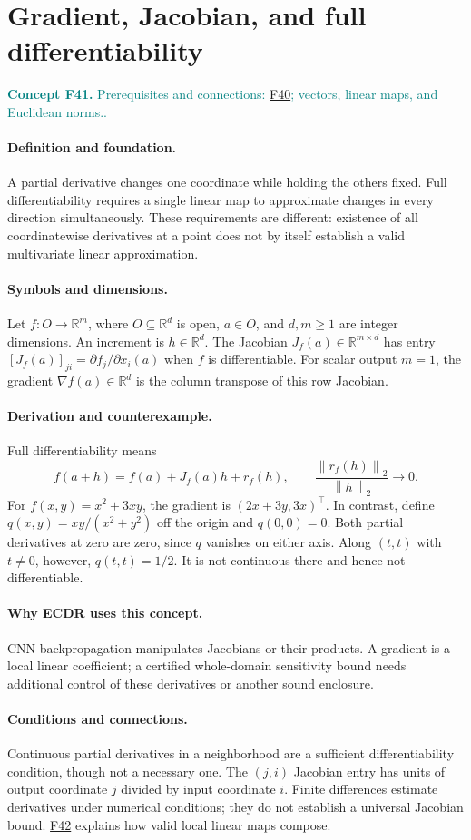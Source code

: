 \documentclass[11pt,a4paper]{article}
\newcommand{\R}{\mathbb R}
\newcommand{\norm}[1]{\left\lVert#1\right\rVert}
\newcommand{\conceptid}{Front matter}
\newcommand{\concept}[3]{\clearpage\renewcommand{\conceptid}{#1}%
\section{#2}\label{concept:#1}%
\textcolor{teal}{\textbf{Concept #1.} Prerequisites and connections: #3.}\par
\typeout{ECDR-CONCEPT-START #1 PAGE=\thepage}}
\begin{document}
\concept{F41}{Gradient, Jacobian, and full differentiability}{\hyperref[concept:F40]{F40}; vectors, linear maps, and Euclidean norms.}
\paragraph{Definition and foundation.}
A partial derivative changes one coordinate while holding the others fixed. Full differentiability requires a single linear map to approximate changes in every direction simultaneously. These requirements are different: existence of all coordinatewise derivatives at a point does not by itself establish a valid multivariate linear approximation.
\paragraph{Symbols and dimensions.}
Let $f:O\to\R^m$, where $O\subseteq\R^d$ is open, $a\in O$, and $d,m\ge1$ are integer dimensions. An increment is $h\in\R^d$. The Jacobian $J_f(a)\in\R^{m\times d}$ has entry $[J_f(a)]_{ji}=\partial f_j/\partial x_i(a)$ when $f$ is differentiable. For scalar output $m=1$, the gradient $\nabla f(a)\in\R^d$ is the column transpose of this row Jacobian.
\paragraph{Derivation and counterexample.}
Full differentiability means
\[
 f(a+h)=f(a)+J_f(a)h+r_f(h),\qquad
 \frac{\norm{r_f(h)}_2}{\norm h_2}\longrightarrow0.
\]
For $f(x,y)=x^2+3xy$, the gradient is $(2x+3y,3x)^\top$. In contrast, define $q(x,y)=xy/(x^2+y^2)$ off the origin and $q(0,0)=0$. Both partial derivatives at zero are zero, since $q$ vanishes on either axis. Along $(t,t)$ with $t\ne0$, however, $q(t,t)=1/2$. It is not continuous there and hence not differentiable.
\paragraph{Why ECDR uses this concept.}
CNN backpropagation manipulates Jacobians or their products. A gradient is a local linear coefficient; a certified whole-domain sensitivity bound needs additional control of these derivatives or another sound enclosure.
\paragraph{Conditions and connections.}
Continuous partial derivatives in a neighborhood are a sufficient differentiability condition, though not a necessary one. The $(j,i)$ Jacobian entry has units of output coordinate $j$ divided by input coordinate $i$. Finite differences estimate derivatives under numerical conditions; they do not establish a universal Jacobian bound. \hyperref[concept:F42]{F42} explains how valid local linear maps compose.
\par\label{endconcept:F41}
\end{document}
